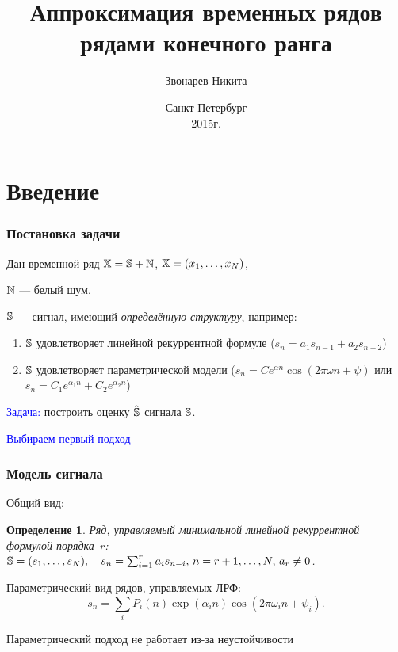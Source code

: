 \documentclass[unicode, notheorems]{beamer}
\title[Аппроксимация рядами конечного ранга]{Аппроксимация временных рядов рядами конечного ранга}
\author[Звонарев Никита]{Звонарев Никита}
\institute[СПбГУ]{Санкт-Петербургский государственный университет \\
    Кафедра статистического моделирования
}
\date{
    Санкт-Петербург\\
    2015г.
}
\newtheorem{definition}{Определение}
\begin{document}
\begin{frame}
    \titlepage
\end{frame}


\section{Введение}
\begin{frame}
	\frametitle{Постановка задачи}
	Дан временной ряд $\mathbb{X} = \mathbb{S} + \mathbb{N}$, $\mathbb{X} = (x_1, \ldots, x_N)$, 
	
	$\mathbb{N}$ --- белый шум.

	$\mathbb{S}$ --- сигнал, имеющий \textit{определённую структуру}, например:
	\begin{enumerate}
		\item $\mathbb{S}$ удовлетворяет линейной рекуррентной формуле ($s_n = a_1 s_{n-1} + a_2 s_{n-2}$)
		\item $\mathbb{S}$ удовлетворяет параметрической модели ($s_n = C e^{\alpha n} \cos(2 \pi \omega n + \psi)$ или $s_n = C_1 e^{\alpha_1 n} + C_2 e^{\alpha_2 n}$)
	\end{enumerate}
	
	\textcolor{blue}{Задача:} построить оценку $\hat {\mathbb{S}}$ сигнала $\mathbb{S}$.
	
	\pause
	
	\textcolor{blue}{Выбираем первый подход}
\end{frame}

\begin{frame}
	\frametitle{Модель сигнала}
	Общий вид:
	
	\begin{definition}
		Ряд, управляемый минимальной линейной рекуррентной формулой порядка~$r$: $\mathbb{S} = (s_1, \ldots, s_N), \quad s_n = \sum_{i = 1}^{r} a_i s_{n-i}, \, n = r + 1, \ldots, N, \, a_r \ne 0$.
	\end{definition}
	
	\vspace{0.5cm}
	Параметрический вид рядов, управляемых ЛРФ:
	\begin{equation*}
	s_n = \sum_i P_i(n) \exp(\alpha_i n) \cos(2 \pi \omega_i n + \psi_i).
	\end{equation*}
	
	Параметрический подход не работает из-за неустойчивости
	
\end{frame}
\end{document}
